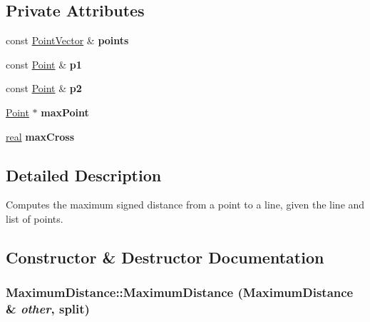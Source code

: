 \subsection*{Private Attributes}
\begin{CompactItemize}
\item 
\hypertarget{class_maximum_distance_77b4e1cbd087d7f30f85884c1c9d02a4}{
const \hyperlink{class_point}{PointVector} \& \textbf{points}}
\label{class_maximum_distance_77b4e1cbd087d7f30f85884c1c9d02a4}

\item 
\hypertarget{class_maximum_distance_1ff10f979e3f1e837602e818ea0b8160}{
const \hyperlink{class_point}{Point} \& \textbf{p1}}
\label{class_maximum_distance_1ff10f979e3f1e837602e818ea0b8160}

\item 
\hypertarget{class_maximum_distance_1186a242927b7fc1a33fca0a6eb86006}{
const \hyperlink{class_point}{Point} \& \textbf{p2}}
\label{class_maximum_distance_1186a242927b7fc1a33fca0a6eb86006}

\item 
\hypertarget{class_maximum_distance_1f85a3af711d8c7608fb589d427c519f}{
\hyperlink{class_point}{Point} $\ast$ \textbf{maxPoint}}
\label{class_maximum_distance_1f85a3af711d8c7608fb589d427c519f}

\item 
\hypertarget{class_maximum_distance_b49089f3da83cc1a0e233ad6262ac6cc}{
\hyperlink{cowichan_8hpp_4d521b2c54a1f6312cc8fa04827eaf98}{real} \textbf{maxCross}}
\label{class_maximum_distance_b49089f3da83cc1a0e233ad6262ac6cc}

\end{CompactItemize}


\subsection{Detailed Description}
Computes the maximum signed distance from a point to a line, given the line and list of points. 

\subsection{Constructor \& Destructor Documentation}
\hypertarget{class_maximum_distance_1cfb6fc5edbc0495b2fe27304063b68e}{
\subsubsection[{MaximumDistance}]{\setlength{\rightskip}{0pt plus 5cm}MaximumDistance::MaximumDistance ({\bf MaximumDistance} \& {\em other}, \/  split)}}
\label{class_maximum_distance_1cfb6fc5edbc0495b2fe27304063b68e}


